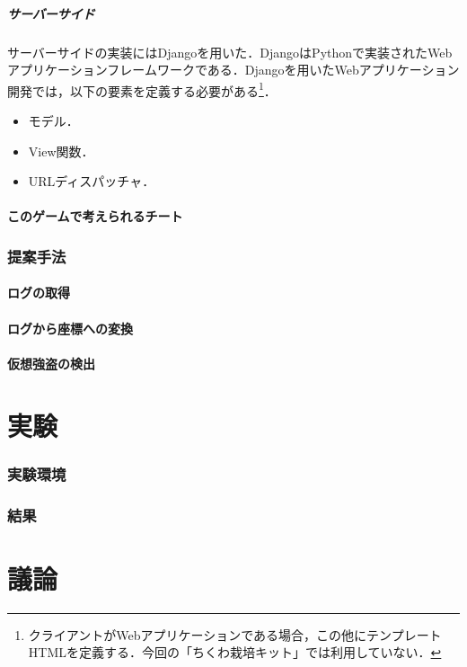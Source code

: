 \documentclass[a4paper,11pt]{jsarticle}
\begin{document}
\subsubsection{サーバーサイド}
サーバーサイドの実装にはDjango\cite{django}を用いた．DjangoはPython\cite{python}で実装されたWebアプリケーションフレームワークである．Djangoを用いたWebアプリケーション開発では，以下の要素を定義する必要がある\footnote{クライアントがWebアプリケーションである場合，この他にテンプレートHTMLを定義する．今回の「ちくわ栽培キット」では利用していない．}．

\begin{itemize}
\item
モデル．
\item
View関数．
\item
URLディスパッチャ．
\end{itemize}

\subsection{このゲームで考えられるチート}

\section{提案手法}
\subsection{ログの取得}
\subsection{ログから座標への変換}
\subsection{仮想強盗の検出}

\newpage
\part{実験}
\section{実験環境}
\section{結果}

\newpage
\part{議論}
\end{document}
